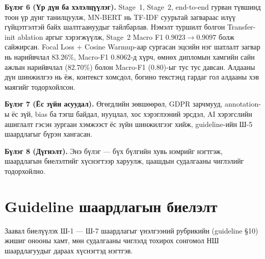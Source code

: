 \textbf{Бүлэг 6 (Үр дүн ба хэлэлцүүлэг).} Stage~1, Stage~2, end-to-end гурван
түвшинд тоон үр дүнг танилцуулж, MN-BERT нь TF-IDF суурьтай загвараас илүү
гүйцэтгэлтэй байх шалтгаануудыг тайлбарлав. Нэмэлт туршилт болгон
Transfer-init ablation аргыг хэрэгжүүлж, Stage~2 Macro F1 $0.9023 \to 0.9097$
болж сайжирсан. Focal Loss + Cosine Warmup-аар сургасан эцсийн нэг шатлалт загвар нь
нарийвчлал $\mathbf{83.26\%}$, Macro-F1 $\mathbf{0.8062}$-д хүрч, өмнөх
дипломын хамгийн сайн ажлын нарийвчлал ($82.70\%$) болон Macro-F1
($0.80$)-ыг тус тус давсан. Алдааны дүн шинжилгээ нь ёж, контекст хомсдол, богино текстэнд гардаг
гол алдааны хэв маягийг тодорхойлсон.

\textbf{Бүлэг 7 (Ёс зүйн асуудал).} Өгөгдлийн зөвшөөрөл, GDPR зарчмууд, annotation-ы
ёс зүй, bias ба тэгш байдал, нууцлал, хос хэрэглээний эрсдэл, AI хэрэгслийн
ашиглалт гэсэн зургаан хэмжээст ёс зүйн шинжилгээг хийж, guideline-ийн
Ш-5 шаардлагыг бүрэн хангасан.

\textbf{Бүлэг 8 (Дүгнэлт).} Энэ бүлэг --- бүх бүлгийн хувь нэмрийг нэгтгэж,
шаардлагын биелэлтийг хүснэгтээр харуулж, цаашдын судалгааны чиглэлийг
тодорхойлно.

\section{Guideline шаардлагын биелэлт}

Заавал биелүүлэх Ш-1 --- Ш-7 шаардлагыг үнэлгээний рубрикийн (guideline §10)
жишиг онооны хамт, мөн судалгааны чиглэлд тохирох сонгомол НШ шаардлагуудыг
дараах хүснэгтэд нэгтгэв.

